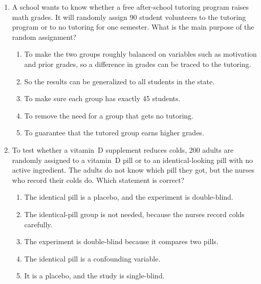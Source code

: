 \documentclass[12pt]{article}
\begin{document}
\begin{enumerate}[leftmargin=1.9em, itemsep=0.13in]
  \boxguard[14]
  \item A school wants to know whether a free after-school tutoring program raises math grades.
        It will randomly assign 90 student volunteers to the tutoring program or to no tutoring
        for one semester. What is the main purpose of the random assignment?
        \begin{enumerate}[label=\textbf{(\Alph*)}, leftmargin=2.2em, itemsep=2pt]
          \item To make the two groups roughly balanced on variables such as motivation and prior
                grades, so a difference in grades can be traced to the tutoring.
          \item So the results can be generalized to all students in the state.
          \item To make sure each group has exactly 45 students.
          \item To remove the need for a group that gets no tutoring.
          \item To guarantee that the tutored group earns higher grades.\hfill{}\rule[-0.2in]{0pt}{0.48in}
        \end{enumerate}

  \boxguard[15]
  \item To test whether a vitamin~D supplement reduces colds, 200 adults are randomly assigned to
        a vitamin~D pill or to an identical-looking pill with no active ingredient. The adults
        do not know which pill they got, but the nurses who record their colds do. Which
        statement is correct?
        \begin{enumerate}[label=\textbf{(\Alph*)}, leftmargin=2.2em, itemsep=2pt]
          \item The identical pill is a placebo, and the experiment is double-blind.
          \item The identical-pill group is not needed, because the nurses record colds carefully.
          \item The experiment is double-blind because it compares two pills.
          \item The identical pill is a confounding variable.
          \item It is a placebo, and the study is single-blind.\hfill{}\rule[-0.2in]{0pt}{0.48in}
        \end{enumerate}


\end{enumerate}
\end{document}
